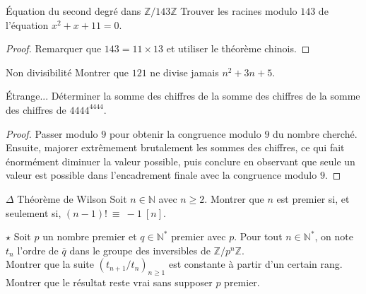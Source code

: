 \documentclass[french,a4paper]{article}
\newcommand{\N}{\mathbb{N}}
\newcommand{\Z}{\mathbb{Z}}
\newcommand{\st}{^*}
\theoremstyle{plain}
\theoremstyle{definition}
\theoremstyle{remark}
\begin{document}
\begin{ex}[Moulin.AG.53]{Équation du second degré dans $\Z/143\Z$}
	Trouver les racines modulo $143$ de l'équation $x^2+x+11=0$.
\end{ex}
\begin{proof}
	Remarquer que $143=11\times 13$ et utiliser le théorème chinois.
\end{proof}

\begin{ex}[Moulin.AG.54]{Non divisibilité}
	Montrer que $121$ ne divise jamais $n^2+3n+5$.
\end{ex}

\begin{ex}{Étrange...}
	Déterminer la somme des chiffres de la somme des chiffres de la somme des chiffres de $4444^{4444}$.
\end{ex}
\begin{proof}
	Passer modulo $9$ pour obtenir la congruence modulo $9$ du nombre cherché. Ensuite, majorer extrêmement brutalement les sommes des chiffres, ce qui fait énormément diminuer la valeur possible, puis conclure en observant que seule un valeur est possible dans l'encadrement finale avec la congruence modulo $9$.
\end{proof}

\begin{ex}[Moulin.AG.55]{$\Delta$ Théorème de Wilson}
	Soit $n\in\N$ avec $n\geqslant 2$. Montrer que $n$ est premier si, et seulement si, $(n-1)!\ \equiv\ -1\ [n]$.
\end{ex}

\begin{ex}[Moulin.AG.56]{$\star$}
	Soit $p$ un nombre premier et $q\in\N\st$ premier avec $p$. Pour tout $n\in\N\st$, on note $t_n$ l'ordre de $\overline{q}$ dans le groupe des inversibles de $\Z/p^n\Z$. \\ Montrer que la suite $(t_{n+1}/t_n)_{n\geqslant 1}$ est constante à partir d'un certain rang.\\ Montrer que le résultat reste vrai sans supposer $p$ premier.
\end{ex}
\end{document}
